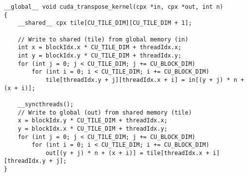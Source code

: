 \lstset{language=C++}
\begin{lstlisting}
__global__ void cuda_transpose_kernel(cpx *in, cpx *out, int n)
{
    __shared__ cpx tile[CU_TILE_DIM][CU_TILE_DIM + 1];

    // Write to shared (tile) from global memory (in)
    int x = blockIdx.x * CU_TILE_DIM + threadIdx.x;
    int y = blockIdx.y * CU_TILE_DIM + threadIdx.y;
    for (int j = 0; j < CU_TILE_DIM; j += CU_BLOCK_DIM)
        for (int i = 0; i < CU_TILE_DIM; i += CU_BLOCK_DIM)
            tile[threadIdx.y + j][threadIdx.x + i] = in[(y + j) * n + (x + i)];

    __syncthreads();
    // Write to global (out) from shared memory (tile)
    x = blockIdx.y * CU_TILE_DIM + threadIdx.x;
    y = blockIdx.x * CU_TILE_DIM + threadIdx.y;
    for (int j = 0; j < CU_TILE_DIM; j += CU_BLOCK_DIM)
        for (int i = 0; i < CU_TILE_DIM; i += CU_BLOCK_DIM)
            out[(y + j) * n + (x + i)] = tile[threadIdx.x + i][threadIdx.y + j];
}
\end{lstlisting}